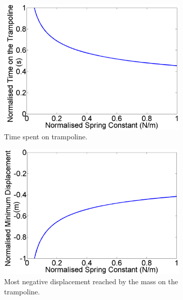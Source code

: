 \begin{figure}[H]
	\centering
    \begin{subfigure}[t]{0.3\textwidth}
		\includegraphics[width=\textwidth]{Norm_Time_Spring.png}
    	\caption{Time spent on trampoline.}\label{fig:Norm_Time_Spring}
    \end{subfigure}\hfill
	\begin{subfigure}[t]{0.3\textwidth}
		\includegraphics[width=\textwidth]{Norm_MinY_Spring.png}
    	\caption{Most negative displacement reached by the mass on the trampoline.}\label{fig:Norm_MinY_Spring}
    \end{subfigure}\hfill
    \begin{subfigure}[t]{0.3\textwidth}

\end{subfigure}
\end{figure}
